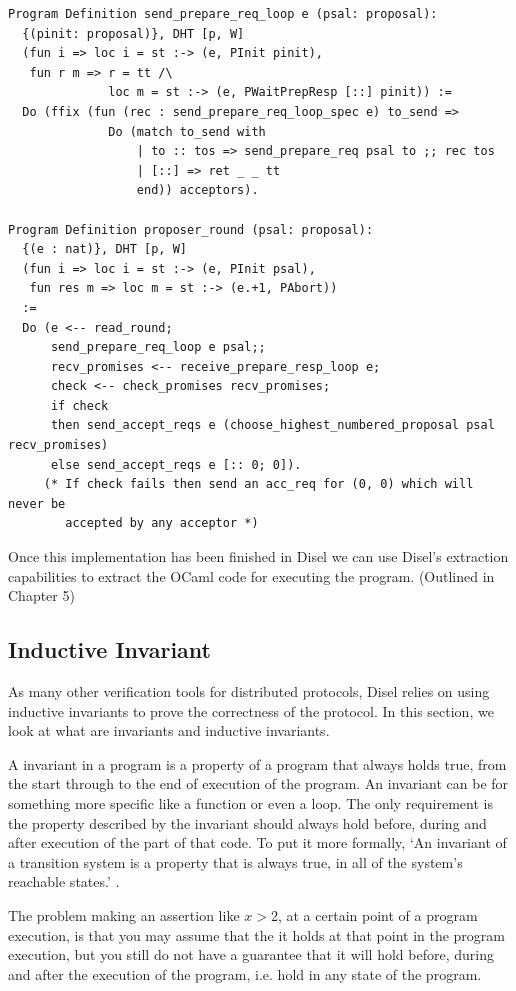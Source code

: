 \begin{lstlisting}
Program Definition send_prepare_req_loop e (psal: proposal):
  {(pinit: proposal)}, DHT [p, W]
  (fun i => loc i = st :-> (e, PInit pinit),
   fun r m => r = tt /\
              loc m = st :-> (e, PWaitPrepResp [::] pinit)) :=
  Do (ffix (fun (rec : send_prepare_req_loop_spec e) to_send =>
              Do (match to_send with
                  | to :: tos => send_prepare_req psal to ;; rec tos
                  | [::] => ret _ _ tt
                  end)) acceptors).

Program Definition proposer_round (psal: proposal):
  {(e : nat)}, DHT [p, W]
  (fun i => loc i = st :-> (e, PInit psal),
   fun res m => loc m = st :-> (e.+1, PAbort))
  :=
  Do (e <-- read_round;
      send_prepare_req_loop e psal;;
      recv_promises <-- receive_prepare_resp_loop e;
      check <-- check_promises recv_promises;
      if check
      then send_accept_reqs e (choose_highest_numbered_proposal psal recv_promises)
      else send_accept_reqs e [:: 0; 0]).
     (* If check fails then send an acc_req for (0, 0) which will never be
        accepted by any acceptor *)
\end{lstlisting}

Once this implementation has been finished in Disel we can use Disel's extraction
capabilities to extract the OCaml code for executing the program. (Outlined in Chapter 5)

\subsection{Inductive Invariant}
As many other verification tools for distributed protocols, Disel relies on using
inductive invariants to prove the correctness of the protocol. In this section,
we look at what are invariants and inductive invariants.

A invariant in a program is a property of a program that always holds true,
from the start through to the end of execution of the program. An invariant can be for something
more specific like a function or even a loop. The only requirement is the property
described by the invariant should always hold before, during and after execution
of the part of that code. To put it more formally,
`An invariant of a transition system is a property that is
always true, in all of the system’s reachable states.' \cite{21}.

The problem making an assertion like $x > 2$, at a certain point of a program execution,
is that you may assume that the it holds at that point in the program execution, but you still
do not have a guarantee that it will hold before, during and after the
execution of the program, i.e. hold in any state of the program.

